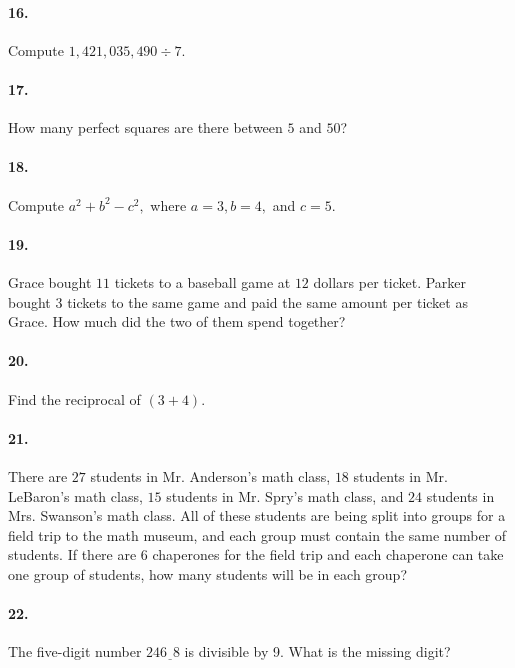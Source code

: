 \documentclass[16pt]{article}
\begin{document}
\paragraph{16. } Compute $1{,}421{,}035{,}490\div 7$.

\paragraph{17. } How many perfect squares are there between $5$ and $50$?

\paragraph{18. } Compute $a^2+b^2-c^2,$ where $a=3, b=4,$ and $c=5.$

\paragraph{19. } Grace bought $11$ tickets to a baseball game at $12$ dollars per ticket. Parker bought $3$ tickets to the same game and paid the same amount per ticket as Grace. How much did the two of them spend together?

\paragraph{20. } Find the reciprocal of $(3+4)$.

\paragraph{21. } There are $27$ students in Mr. Anderson's math class, $18$ students in Mr. LeBaron's math class, $15$ students in Mr. Spry's math class, and $24$ students in Mrs. Swanson's math class. All of these students are being split into groups for a field trip to the math museum, and each group must contain the same number of students. If there are $6$ chaperones for the field trip and each chaperone can take one group of students, how many students will be in each group?

\paragraph{22. } The five-digit number $246\underline{\hspace{5pt}}8$ is divisible by 9. What is the missing digit?
\end{document}
